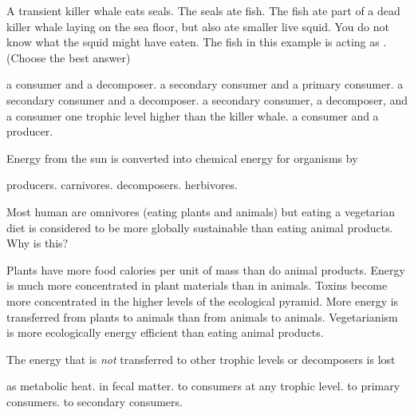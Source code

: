 \question
A transient killer whale eats seals. The seals ate fish. The fish ate part of a dead killer whale laying on the sea floor, but also ate smaller live squid. You do not know what the squid might have eaten. The fish in this example is acting as \underline{\hspace{2cm}}. (Choose the best answer)

\begin{choices}
\correctchoice a consumer and a decomposer.%
\choice a secondary consumer and a primary consumer.%
\choice a secondary consumer and a decomposer.%
\choice a secondary consumer, a decomposer, and a consumer one trophic level higher than the killer whale.%
\choice a consumer and a producer.%
\end{choices}

\question
Energy from the sun is converted into chemical energy for organisms by

\begin{choices}
\correctchoice producers.%
\choice carnivores.%
\choice decomposers.%
\choice herbivores.%
\end{choices}


\question
Most human are omnivores (eating plants and animals) but eating a vegetarian diet is considered to be more globally sustainable than eating animal products. Why is this?
 
\begin{choices}
\choice Plants have more food calories per unit of mass than do animal products. %
\choice Energy is much more concentrated in plant materials than in animals. %
\choice Toxins become more concentrated in the higher levels of the ecological pyramid. %
\choice More energy is transferred from plants to animals than from animals to animals. %
\correctchoice Vegetarianism is more ecologically energy efficient than eating animal products. %
\end{choices}

\question
The energy that is \textit{not} transferred to other trophic levels or decomposers is lost

\begin{choices}
\correctchoice as metabolic heat.%
\choice in fecal matter.%
\choice to consumers at any trophic level.%
\choice to primary consumers.%
\choice to secondary consumers.%
\end{choices}


